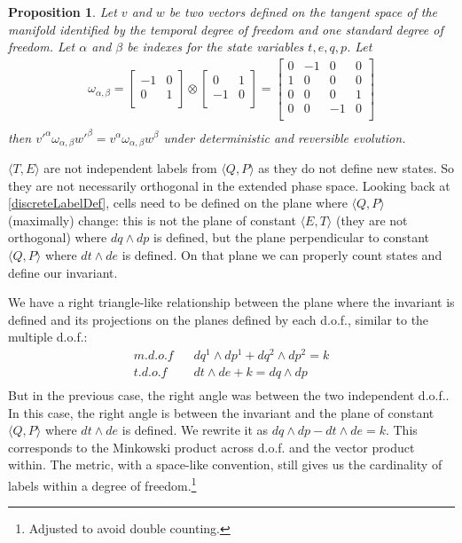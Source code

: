 \documentclass[aps,twocolumn,floatfix,nofootinbib]{revtex4}   %
\newtheorem{prop}[thm]{Proposition}
\theoremstyle{definition}
\begin{document}
\begin{prop}\label{tdofInvariant}
Let $v$ and $w$ be two vectors defined on the tangent space of the manifold identified by the temporal degree of freedom and one standard degree of freedom. Let $\alpha$ and $\beta$ be indexes for the state variables $t, e, q, p$. Let
\begin{align*}
\omega_{\alpha, \beta} =  \left[
  \begin{array}{cc}
    -1 & 0 \\
    0 & 1 \\
  \end{array}
\right] \otimes \left[
  \begin{array}{cc}
    0 & 1 \\
    -1 & 0 \\
  \end{array}
\right]
= \left[
  \begin{array}{cccc}
    0 & -1 & 0 & 0 \\
    1 & 0 & 0 & 0 \\
    0 & 0 & 0 & 1 \\
    0 & 0 & -1 & 0 \\
  \end{array}
\right] \\
\end{align*}
then $v'^{\alpha} \omega_{\alpha, \beta} w'^{\beta}=v^{\alpha} \omega_{\alpha, \beta} w^{\beta}$ under deterministic and reversible evolution.
\end{prop}

$\langle T, E \rangle$ are not independent labels from $\langle Q, P \rangle$ as they do not define new states. So they are not necessarily orthogonal in the extended phase space. Looking back at \ref{discreteLabelDef}, cells need to be defined on the plane where $\langle Q, P \rangle$ (maximally) change: this is not the plane of constant $\langle E, T \rangle$ (they are not orthogonal) where $dq \wedge dp$ is defined, but the plane perpendicular to constant $\langle Q, P \rangle$ where $dt \wedge de$ is defined. On that plane we can properly count states and define our invariant.

We have a right triangle-like relationship between the plane where the invariant is defined and its projections on the planes defined by each d.o.f., similar to the multiple d.o.f.:
\begin{align*}
m.d.o.f \;\;\; &dq^1 \wedge dp^1 + dq^2 \wedge dp^2 = k \\
t.d.o.f \;\;\; &dt \wedge de + k = dq \wedge dp \\
\end{align*}
But in the previous case, the right angle was between the two independent d.o.f.. In this case, the right angle is between the invariant and the plane of constant $\langle Q, P \rangle$ where $dt \wedge de$ is defined. We rewrite it as $dq \wedge dp - dt \wedge de = k$. This corresponds to the Minkowski product across d.o.f. and the vector product within. The metric, with a space-like convention, still gives us the cardinality of labels within a degree of freedom.\footnote{Adjusted to avoid double counting.}
\end{document}

